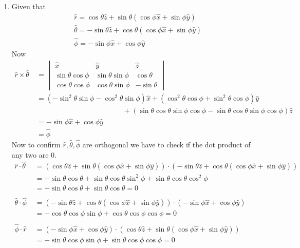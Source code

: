\documentclass{article}
\begin{document}
\begin{enumerate}
\item Given that $$\begin{aligned}
	&\hat{r}=\cos \theta \hat{z}+\sin \theta(\cos \phi \hat{x}+\sin \phi \hat{y}) \\
	&\hat{\theta}=-\sin \theta \hat{z}+\cos \theta(\cos \phi \hat{x}+\sin \phi \hat{y}) \\
	&\hat{\phi}=-\sin \phi \hat{x}+\cos \phi \hat{y}
\end{aligned}$$Now \begin{align*}
\hat{r}\times\hat{\theta}\ &=\begin{vmatrix}
	\hat{x}&\hat{y}&\hat{z}\\
	\sin \theta\cos \phi&\sin \theta\sin\phi&\cos \theta\\
	\cos \theta\cos \phi&\cos \theta\sin \phi&-\sin\theta
\end{vmatrix}\\
&=(-\sin^2\theta\sin\phi-\cos^2\theta\sin\phi)\hat{x}+(\cos^2\theta\cos\phi+\sin^2\theta\cos\phi)\hat{y}\\
&\qquad\qquad\qquad\qquad\qquad\qquad+(\sin\theta\cos\theta\sin\phi\cos\phi-\sin\theta\cos\theta\sin\phi\cos\phi)\hat{z}\\
&=-\sin\phi\hat{x}+\cos\phi\hat{y}\\
&=\hat{\phi}\end{align*}
Now to confirm $\hat{r},\hat{\theta},\hat{\phi}$ are orthogonal we have to check if the dot product of any two are 0.\begin{align*}
	\hat{r}\cdot\hat{\theta}\ &=(\cos \theta \hat{z}+\sin \theta(\cos \phi \hat{x}+\sin \phi \hat{y}))\cdot(-\sin \theta \hat{z}+\cos \theta(\cos \phi \hat{x}+\sin \phi \hat{y}))\\
	&=-\sin\theta\cos\theta+\sin\theta\cos\theta\sin^2\phi+\sin\theta\cos\theta\cos^2\phi\\
	&=-\sin\theta\cos\theta+\sin\theta\cos\theta=0\\
	\qquad\\
	\hat{\theta}\cdot\hat{\phi}\ &=(-\sin \theta \hat{z}+\cos \theta(\cos \phi \hat{x}+\sin \phi \hat{y}))\cdot(-\sin \phi \hat{x}+\cos \phi \hat{y})\\
	&=-\cos\theta\cos\phi\sin\phi+\cos\theta\cos\phi\cos\phi=0\\
	\qquad\\
	\hat{\phi}\cdot\hat{r}\ &=(-\sin \phi \hat{x}+\cos \phi \hat{y})\cdot(\cos \theta \hat{z}+\sin \theta(\cos \phi \hat{x}+\sin \phi \hat{y}))\\
	&=-\sin\theta\cos\phi\sin\phi+\sin\theta\cos\phi\cos\phi=0

\end{align*}
\end{enumerate}
\end{document}
